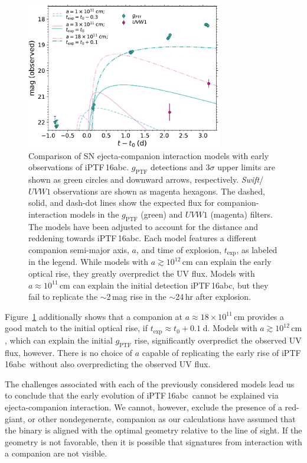 \documentclass[twocolumn]{aastex61}
\newcommand{\abc}{iPTF\,16abc}
\begin{document}
\begin{figure}[!thb]
  \centering
  \includegraphics[width=3.35in]{companion_lc.pdf}
  \caption{Comparison of SN ejecta-companion interaction models 
  with early observations of \abc. $g_\mathrm{PTF}$ 
  detections and 3$\sigma$ upper limits are shown 
  as green circles and downward arrows, respectively. 
  \textit{Swift}/$UVW1$ observations are shown as magenta hexagons.
  The dashed, solid, and dash-dot lines show the expected flux 
  for companion-interaction models in the $g_\mathrm{PTF}$ (green) 
  and $UVW1$ (magenta) filters. The models have been adjusted to 
  account for the distance and reddening towards \abc. Each 
  model features a different companion semi-major axis, $a$, and 
  time of explosion, $t_\mathrm{exp}$, as labeled in the 
  legend. While models with $a \gtrsim 10^{12} \, \mathrm{cm}$ can 
  explain the early optical rise, they greatly 
  overpredict the UV flux. Models with $a \approx 10^{11} \, 
  \mathrm{cm}$ can explain the initial detection \abc, but they 
  fail to replicate the $\sim$2\,mag rise in the $\sim$24\,hr 
  after explosion.
  }
  \label{fig:SN-companion}
\end{figure}

Figure~\ref{fig:SN-companion} additionally shows that a companion at $a
\approx 18 \times 10^{11} \, \mathrm{cm}$ provides a good match to the initial
optical rise, if $t_\mathrm{exp} \approx t_0 + 0.1 \; \mathrm{d}$. Models with
$a \gtrsim 10^{12} \, \mathrm{cm}$, which can explain the initial
$g_\mathrm{PTF}$ rise, significantly overpredict the observed UV flux,
however. There is no choice of $a$ capable of replicating the early rise of
\abc\ without also overpredicting the observed UV flux.

The challenges associated with each of the previously considered models lead
us to conclude that the early evolution of \abc\ cannot be explained via
ejecta-companion interaction. We cannot, however, exclude the presence of a
red-giant, or other nondegenerate, companion as our calculations have assumed
that the binary is aligned with the optimal geometry relative to the line of
sight. If the geometry is not favorable, then it is possible that signatures
from interaction with a companion are not visible.
\end{document}
